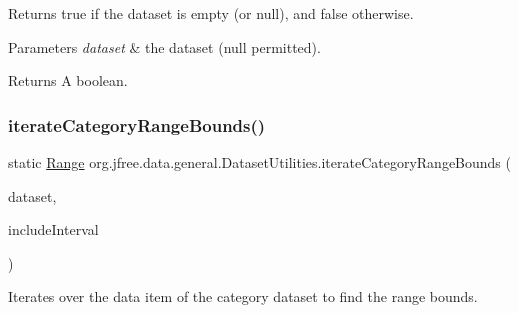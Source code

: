 Returns {\ttfamily true} if the dataset is empty (or {\ttfamily null}), and {\ttfamily false} otherwise.


\begin{DoxyParams}{Parameters}
{\em dataset} & the dataset ({\ttfamily null} permitted).\\
\hline
\end{DoxyParams}
\begin{DoxyReturn}{Returns}
A boolean. 
\end{DoxyReturn}
\mbox{\label{classorg_1_1jfree_1_1data_1_1general_1_1_dataset_utilities_aa2fe9054ca3eacd028b16e9eadba477b}} 
\subsubsection{\texorpdfstring{iterate\+Category\+Range\+Bounds()}{iterateCategoryRangeBounds()}}
{\footnotesize\ttfamily static \mbox{\hyperlink{classorg_1_1jfree_1_1data_1_1_range}{Range}} org.\+jfree.\+data.\+general.\+Dataset\+Utilities.\+iterate\+Category\+Range\+Bounds (\begin{DoxyParamCaption}\item[{\mbox{\hyperlink{interfaceorg_1_1jfree_1_1data_1_1category_1_1_category_dataset}{Category\+Dataset}}}]{dataset,  }\item[{boolean}]{include\+Interval }\end{DoxyParamCaption})\hspace{0.3cm}{\ttfamily [static]}}

Iterates over the data item of the category dataset to find the range bounds.


